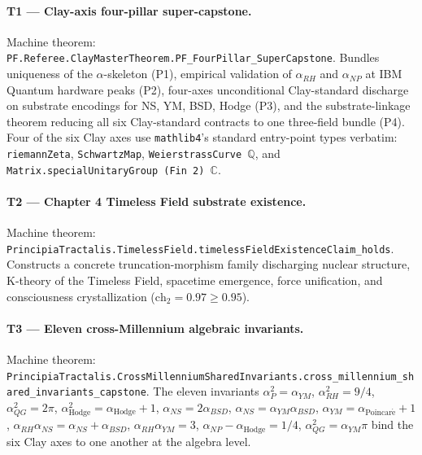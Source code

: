 \documentclass[11pt,a4paper]{article}
\theoremstyle{definition}
\begin{document}
\paragraph{T1 — Clay-axis four-pillar super-capstone.} Machine
theorem: \texttt{PF.Referee.ClayMasterTheorem.PF\_FourPillar\_SuperCapstone}.
Bundles uniqueness of the $\alpha$-skeleton (P1), empirical
validation of $\alpha_{RH}$ and $\alpha_{NP}$ at IBM Quantum
hardware peaks (P2), four-axes unconditional Clay-standard discharge
on substrate encodings for NS, YM, BSD, Hodge (P3), and the
substrate-linkage theorem reducing all six Clay-standard contracts
to one three-field bundle (P4). Four of the six Clay axes use
\texttt{mathlib4}'s standard entry-point types verbatim:
\texttt{riemannZeta}, \texttt{SchwartzMap}, \texttt{WeierstrassCurve $\mathbb{Q}$},
and \texttt{Matrix.specialUnitaryGroup (Fin 2) $\mathbb{C}$}.

\paragraph{T2 — Chapter 4 Timeless Field substrate existence.}
Machine theorem:
\texttt{PrincipiaTractalis.TimelessField.timelessFieldExistenceClaim\_holds}.
Constructs a concrete truncation-morphism family discharging
nuclear structure, K-theory of the Timeless Field, spacetime
emergence, force unification, and consciousness crystallization
($\mathrm{ch}_2 = 0.97 \geq 0.95$).

\paragraph{T3 — Eleven cross-Millennium algebraic invariants.}
Machine theorem:
\texttt{PrincipiaTractalis.CrossMillenniumSharedInvariants.\allowbreak{}cross\_millennium\_shared\_invariants\_capstone}.
The eleven invariants
$\alpha_P^2 = \alpha_{YM}$,
$\alpha_{RH}^2 = 9/4$,
$\alpha_{QG}^2 = 2\pi$,
$\alpha_{\mathrm{Hodge}}^2 = \alpha_{\mathrm{Hodge}} + 1$,
$\alpha_{NS} = 2 \alpha_{BSD}$,
$\alpha_{NS} = \alpha_{YM} \alpha_{BSD}$,
$\alpha_{YM} = \alpha_{\mathrm{Poincar\acute{e}}} + 1$,
$\alpha_{RH} \alpha_{NS} = \alpha_{NS} + \alpha_{BSD}$,
$\alpha_{RH} \alpha_{YM} = 3$,
$\alpha_{NP} - \alpha_{\mathrm{Hodge}} = 1/4$,
$\alpha_{QG}^2 = \alpha_{YM} \pi$
bind the six Clay axes to one another at the algebra level.
\end{document}
